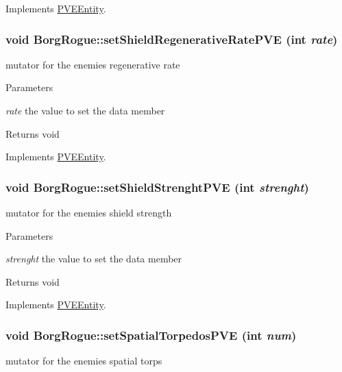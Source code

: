 Implements \hyperlink{classPVEEntity}{PVEEntity}.

\hypertarget{classBorgRogue_afaa9f67e6e5536b0aa63ce8120c0247f}{
\subsubsection[{setShieldRegenerativeRatePVE}]{\setlength{\rightskip}{0pt plus 5cm}void BorgRogue::setShieldRegenerativeRatePVE (int {\em rate})}}
\label{db/d4f/classBorgRogue_afaa9f67e6e5536b0aa63ce8120c0247f}
mutator for the enemies regenerative rate


\begin{DoxyParams}{Parameters}
\item[{\em rate}]the value to set the data member\end{DoxyParams}
\begin{DoxyReturn}{Returns}
void 
\end{DoxyReturn}


Implements \hyperlink{classPVEEntity}{PVEEntity}.

\hypertarget{classBorgRogue_a99ce619718648684b12ffdbaa7fd983f}{
\subsubsection[{setShieldStrenghtPVE}]{\setlength{\rightskip}{0pt plus 5cm}void BorgRogue::setShieldStrenghtPVE (int {\em strenght})}}
\label{db/d4f/classBorgRogue_a99ce619718648684b12ffdbaa7fd983f}
mutator for the enemies shield strength


\begin{DoxyParams}{Parameters}
\item[{\em strenght}]the value to set the data member\end{DoxyParams}
\begin{DoxyReturn}{Returns}
void 
\end{DoxyReturn}


Implements \hyperlink{classPVEEntity}{PVEEntity}.

\hypertarget{classBorgRogue_ad983f34e403f754d256527f784465ba5}{
\subsubsection[{setSpatialTorpedosPVE}]{\setlength{\rightskip}{0pt plus 5cm}void BorgRogue::setSpatialTorpedosPVE (int {\em num})}}
\label{db/d4f/classBorgRogue_ad983f34e403f754d256527f784465ba5}
mutator for the enemies spatial torps


